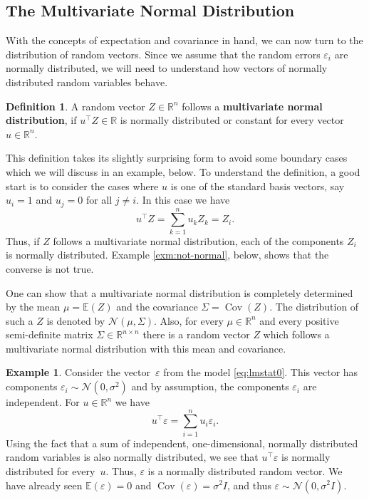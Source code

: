 \documentclass[
  a4paper,
]{article}
\theoremstyle{definition}
\newtheorem{definition}{Definition}[section]
\theoremstyle{definition}
\newtheorem{example}{Example}[section]
\theoremstyle{definition}
\theoremstyle{definition}
\theoremstyle{remark}
\begin{document}
\subsection{The Multivariate Normal Distribution}\label{the-multivariate-normal-distribution}

With the concepts of expectation and covariance in hand, we can now turn to
the distribution of random vectors. Since we assume that the random errors
\(\varepsilon_i\) are normally distributed, we will need to understand how vectors of
normally distributed random variables behave.

\begin{definition}
A random vector \(Z\in\mathbb{R}^n\) follows a \textbf{multivariate normal distribution},
if \(u^\top Z \in\mathbb{R}\) is normally distributed or constant for every
vector~\(u\in\mathbb{R}^n\).
\end{definition}

This definition takes its slightly surprising form to avoid some boundary cases
which we will discuss in an example, below. To understand the definition, a good
start is to consider the cases where \(u\) is one of the standard basis vectors,
say \(u_i = 1\) and \(u_j = 0\) for all \(j\neq i\). In this case we have
\begin{equation*}
  u^\top Z
  = \sum_{k=1}^n u_k Z_k
  = Z_i.
\end{equation*}
Thus, if \(Z\) follows a multivariate normal distribution, each of the
components \(Z_i\) is normally distributed. Example \ref{exm:not-normal},
below, shows that the converse is not true.

One can show that a multivariate normal distribution is completely determined
by the mean \(\mu = \mathbb{E}(Z)\) and the covariance \(\Sigma = \mathop{\mathrm{Cov}}(Z)\). The
distribution of such a \(Z\) is denoted by \(\mathcal{N}(\mu, \Sigma)\). Also, for every
\(\mu\in\mathbb{R}^n\) and every positive semi-definite matrix \(\Sigma\in\mathbb{R}^{n\times n}\)
there is a random vector \(Z\) which follows a multivariate normal distribution
with this mean and covariance.

\begin{example}
Consider the vector~\(\varepsilon\) from the model \eqref{eq:lmstat0}.
This vector has components \(\varepsilon_i \sim \mathcal{N}(0, \sigma^2)\) and by
assumption, the components \(\varepsilon_i\) are independent.
For \(u\in\mathbb{R}^n\) we have
\begin{equation*}
  u^\top \varepsilon
  = \sum_{i=1}^n u_i \varepsilon_i.
\end{equation*}
Using the fact that a sum of independent, one-dimensional, normally
distributed random variables is also normally distributed, we see that
\(u^\top \varepsilon\) is normally distributed for every~\(u\). Thus, \(\varepsilon\) is a
normally distributed random vector.
We have already seen \(\mathbb{E}(\varepsilon) = 0\) and \(\mathop{\mathrm{Cov}}(\varepsilon) = \sigma^2 I\),
and thus \(\varepsilon\sim \mathcal{N}(0, \sigma^2 I)\).
\end{example}
\end{document}
